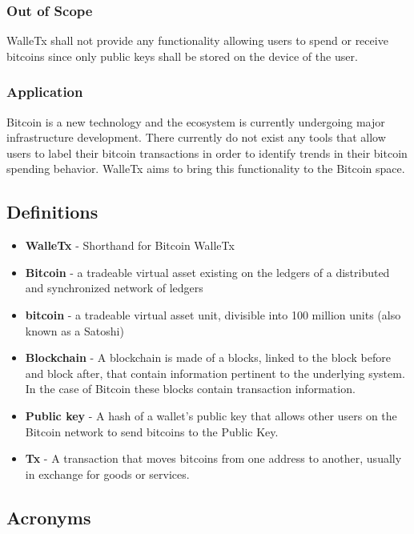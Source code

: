   \subsubsection{Out of Scope}
  WalleTx shall not provide any functionality allowing users to spend or receive bitcoins since only public keys shall be stored on the device of the user.
	
  \subsubsection{Application} 
  Bitcoin is a new technology and the ecosystem is currently undergoing major infrastructure development. There currently do not exist any tools that allow users to label their bitcoin transactions in order to identify trends in their bitcoin spending behavior. WalleTx aims to bring this functionality to the Bitcoin space.
    
	\subsection{Definitions}

	\begin{itemize}
    \item \textbf{WalleTx} - Shorthand for Bitcoin WalleTx
    \item \textbf{Bitcoin} - a tradeable virtual asset existing on the ledgers of a distributed and synchronized network of ledgers
    \item \textbf{bitcoin} - a tradeable virtual asset unit, divisible into 100 million units (also known as a Satoshi) 
    \item \textbf{Blockchain} - A blockchain is made of a blocks, linked to the block before and block after, that contain information pertinent to the underlying system. In the case of Bitcoin these blocks contain transaction information.
    \item \textbf{Public key} - A hash of a wallet's public key that allows other users on the Bitcoin network to send bitcoins to the Public Key. 
    \item \textbf{Tx} - A transaction that moves bitcoins from one address to another, usually in exchange for goods or services.
	\end{itemize}

	\subsection{Acronyms}

